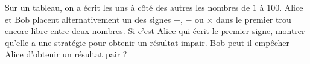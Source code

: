 Sur un tableau, on a écrit les uns à côté des autres les nombres de $1$ à $100$. Alice et Bob placent alternativement un des signes $+$, $-$ ou $\times$ dans le premier trou encore libre entre deux nombres. Si c'est Alice qui écrit le premier signe, montrer qu'elle a une stratégie pour obtenir un résultat impair. Bob peut-il empêcher Alice d'obtenir un résultat pair ?
